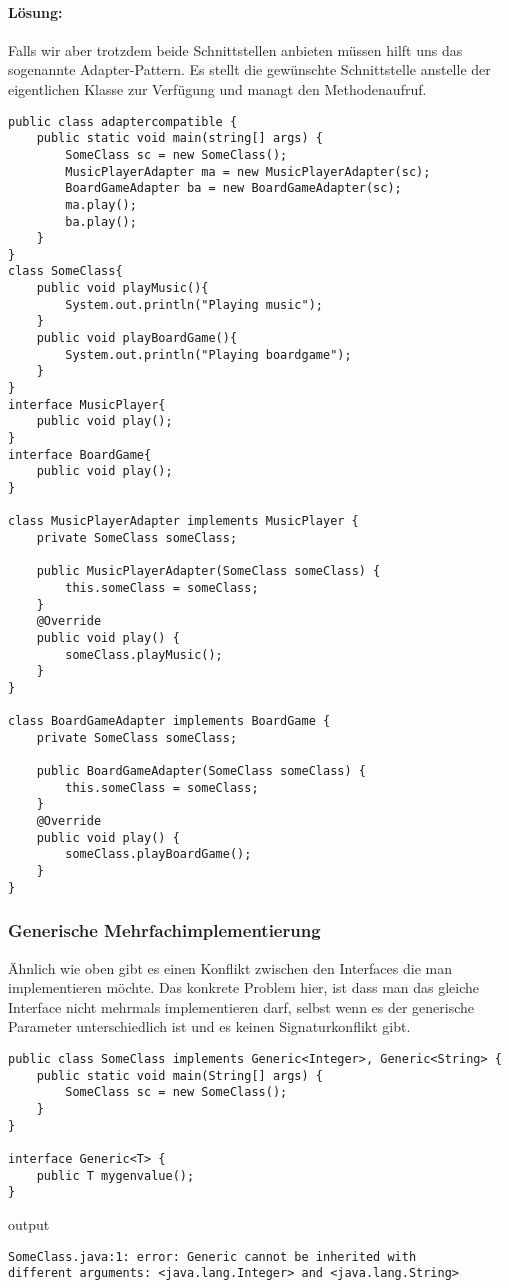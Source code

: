\documentclass[a4paper, 1ppt]{article}
\begin{document}
\paragraph{Lösung:}

Falls wir aber trotzdem beide Schnittstellen anbieten müssen hilft uns das sogenannte Adapter-Pattern.
Es stellt die gewünschte Schnittstelle anstelle der eigentlichen Klasse zur Verfügung und managt den Methodenaufruf.
\begin{verbatim}
public class adaptercompatible {
    public static void main(string[] args) {
        SomeClass sc = new SomeClass();
        MusicPlayerAdapter ma = new MusicPlayerAdapter(sc);
        BoardGameAdapter ba = new BoardGameAdapter(sc);
        ma.play();
        ba.play();
    }
}
class SomeClass{
    public void playMusic(){
        System.out.println("Playing music");
    }
    public void playBoardGame(){
        System.out.println("Playing boardgame");
    }
}
interface MusicPlayer{
    public void play();
}
interface BoardGame{
    public void play();
}

class MusicPlayerAdapter implements MusicPlayer {
    private SomeClass someClass;
    
    public MusicPlayerAdapter(SomeClass someClass) {
        this.someClass = someClass;
    }
    @Override
    public void play() {
        someClass.playMusic();
    }
}

class BoardGameAdapter implements BoardGame {
    private SomeClass someClass;
    
    public BoardGameAdapter(SomeClass someClass) {
        this.someClass = someClass;
    }
    @Override
    public void play() {
        someClass.playBoardGame();
    }
}
\end{verbatim}
\subsubsection{Generische Mehrfachimplementierung}
Ähnlich wie oben gibt es einen Konflikt zwischen den Interfaces die man implementieren möchte.
Das konkrete Problem hier, ist dass man das gleiche Interface nicht mehrmals implementieren darf, selbst wenn es der generische Parameter unterschiedlich ist und es keinen Signaturkonflikt gibt.
\begin{verbatim}
public class SomeClass implements Generic<Integer>, Generic<String> {
    public static void main(String[] args) {
        SomeClass sc = new SomeClass();
    }
}

interface Generic<T> {
    public T mygenvalue();
}
\end{verbatim}
output
\begin{verbatim}
SomeClass.java:1: error: Generic cannot be inherited with
different arguments: <java.lang.Integer> and <java.lang.String>
\end{verbatim}
\end{document}
